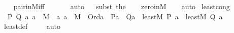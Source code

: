 \begin{isabellebody}
\ \ \isamarkupfalse%
\ pair{\isacharunderscore}{\kern0pt}in{\isacharunderscore}{\kern0pt}M{\isacharunderscore}{\kern0pt}iff\isanewline
\ \ \ \ \ \isamarkupfalse%
\ auto{\isacharbrackleft}{\kern0pt}{}{\isacharbrackright}{\kern0pt}\isanewline
\ \ \isamarkupfalse%
{\isacharparenleft}{\kern0pt}subst\ the{\isacharunderscore}{\kern0pt}{}{\isacharparenright}{\kern0pt}\isanewline
\ \ \isamarkupfalse%
\ zero{\isacharunderscore}{\kern0pt}in{\isacharunderscore}{\kern0pt}M\isanewline
\ \ \isamarkupfalse%
\ auto%
\endisatagproof
{\isafoldproof}%
%
\isadelimproof
\isanewline
%
\endisadelimproof
\isanewline
{}\isamarkupfalse%
\ least{\isacharunderscore}{\kern0pt}cong\ {\isacharcolon}{\kern0pt}\ \isanewline
\ \ {\isachardoublequoteopen}{\isasymAnd}P\ Q\ a{\isachardot}{\kern0pt}\ a\ {\isasymin}\ M\ {\isasymLongrightarrow}\ {\isacharparenleft}{\kern0pt}{\isasymAnd}a{\isachardot}{\kern0pt}\ a\ {\isasymin}\ M\ {\isasymLongrightarrow}\ Ord{\isacharparenleft}{\kern0pt}a{\isacharparenright}{\kern0pt}\ {\isasymLongrightarrow}\ P{\isacharparenleft}{\kern0pt}a{\isacharparenright}{\kern0pt}\ {\isasymlongleftrightarrow}\ Q{\isacharparenleft}{\kern0pt}a{\isacharparenright}{\kern0pt}{\isacharparenright}{\kern0pt}\ {\isasymLongrightarrow}\ least{\isacharparenleft}{\kern0pt}{\isacharhash}{\kern0pt}{\isacharhash}{\kern0pt}M{\isacharcomma}{\kern0pt}\ P{\isacharcomma}{\kern0pt}\ a{\isacharparenright}{\kern0pt}\ {\isasymlongleftrightarrow}\ least{\isacharparenleft}{\kern0pt}{\isacharhash}{\kern0pt}{\isacharhash}{\kern0pt}M{\isacharcomma}{\kern0pt}\ Q{\isacharcomma}{\kern0pt}\ a{\isacharparenright}{\kern0pt}{\isachardoublequoteclose}\ \isanewline
%
\isadelimproof
\ \ %
\endisadelimproof
%
\isatagproof
{}\isamarkupfalse%
\ least{\isacharunderscore}{\kern0pt}def\ \isanewline
\ \ \isamarkupfalse%
\ auto%
\endisatagproof
{\isafoldproof}%
%
\isadelimproof
\isanewline
%
\endisadelimproof
\isanewline
\isanewline
\isanewline
{}\isamarkupfalse%
\isanewline
%
\isadelimtheory
%
\endisadelimtheory
%
\isatagtheory
{}\isamarkupfalse%
%
\endisatagtheory
{\isafoldtheory}%
%
\isadelimtheory
%
\endisadelimtheory
%
\end{isabellebody}%
\endinput

